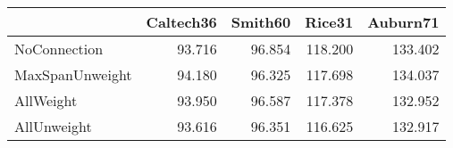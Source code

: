 \begin{tabular}{lrrrr}
\toprule
{} & Caltech36 & Smith60 &  Rice31 & Auburn71 \\
\midrule
NoConnection    &    93.716 &  96.854 & 118.200 &  133.402 \\
MaxSpanUnweight &    94.180 &  96.325 & 117.698 &  134.037 \\
AllWeight       &    93.950 &  96.587 & 117.378 &  132.952 \\
AllUnweight     &    93.616 &  96.351 & 116.625 &  132.917 \\
\bottomrule
\end{tabular}
